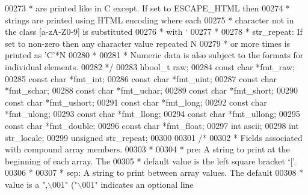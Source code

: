 \begin{DoxyCode}
{{{{{{{{{{{{00273 \textcolor{comment}{     *               are printed like in C except. If set to ESCAPE\_HTML then}
00274 \textcolor{comment}{     *               strings are printed using HTML encoding where each}
00275 \textcolor{comment}{     *               character not in the class [a-zA-Z0-9] is substituted}
00276 \textcolor{comment}{     *               with `%
00277 \textcolor{comment}{     *}
00278 \textcolor{comment}{     *   str\_repeat: If set to non-zero then any character value repeated N}
00279 \textcolor{comment}{     *               or more times is printed as 'C'*N}
00280 \textcolor{comment}{     *}
00281 \textcolor{comment}{     * Numeric data is also subject to the formats for individual elements.}
00282 \textcolor{comment}{     */}
00283     hbool\_t     raw;
00284     \textcolor{keyword}{const} \textcolor{keywordtype}{char}  *fmt\_raw;
00285     \textcolor{keyword}{const} \textcolor{keywordtype}{char}  *fmt\_int;
00286     \textcolor{keyword}{const} \textcolor{keywordtype}{char}  *fmt\_uint;
00287     \textcolor{keyword}{const} \textcolor{keywordtype}{char}  *fmt\_schar;
00288     \textcolor{keyword}{const} \textcolor{keywordtype}{char}  *fmt\_uchar;
00289     \textcolor{keyword}{const} \textcolor{keywordtype}{char}  *fmt\_short;
00290     \textcolor{keyword}{const} \textcolor{keywordtype}{char}  *fmt\_ushort;
00291     \textcolor{keyword}{const} \textcolor{keywordtype}{char}  *fmt\_long;
00292     \textcolor{keyword}{const} \textcolor{keywordtype}{char}  *fmt\_ulong;
00293     \textcolor{keyword}{const} \textcolor{keywordtype}{char}  *fmt\_llong;
00294     \textcolor{keyword}{const} \textcolor{keywordtype}{char}  *fmt\_ullong;
00295     \textcolor{keyword}{const} \textcolor{keywordtype}{char}  *fmt\_double;
00296     \textcolor{keyword}{const} \textcolor{keywordtype}{char}  *fmt\_float;
00297     \textcolor{keywordtype}{int}         ascii;
00298     \textcolor{keywordtype}{int}         str\_locale;
00299     \textcolor{keywordtype}{unsigned}    str\_repeat;
00300 
00301     \textcolor{comment}{/*}
00302 \textcolor{comment}{     * Fields associated with compound array members.}
00303 \textcolor{comment}{     *}
00304 \textcolor{comment}{     *   pre:       A string to print at the beginning of each array. The}
00305 \textcolor{comment}{     *              default value is the left square bracket `['.}
00306 \textcolor{comment}{     *}
00307 \textcolor{comment}{     *   sep:       A string to print between array values.  The default}
00308 \textcolor{comment}{     *              value is a ",\(\backslash\)001" ("\(\backslash\)001" indicates an optional line}
}}}}}}}}}}}}}
\end{DoxyCode}
